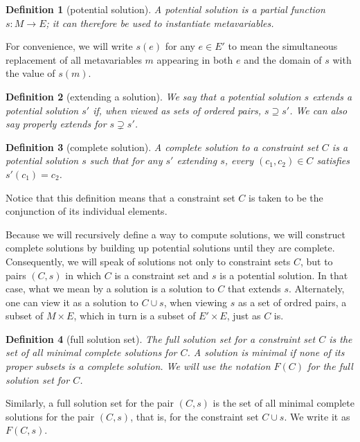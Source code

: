 \documentclass{article}
\newtheorem{dfn}{Definition}
\begin{document}
\begin{dfn}[potential solution]
A \emph{potential solution} is a partial function $s:M\to E$; it can therefore be used to instantiate metavariables.
\end{dfn}

For convenience, we will write $s(e)$ for any $e\in E'$ to mean the simultaneous replacement of all metavariables $m$ appearing in both $e$ and the domain of $s$ with the value of $s(m)$.

\begin{dfn}[extending a solution]
We say that a potential solution $s$ \emph{extends} a potential solution $s'$ if, when viewed as sets of ordered pairs, $s\supseteq s'$.  We can also say \emph{properly extends} for $s\supsetneq s'$.
\end{dfn}

\begin{dfn}[complete solution]\label{D:sol}
A \emph{complete solution} to a constraint set $C$ is a potential solution $s$ such that for any $s'$ extending $s$, every $(c_1,c_2)\in C$ satisfies $s'(c_1)=c_2$.
\end{dfn}

Notice that this definition means that a constraint set $C$ is taken to be the conjunction of its individual elements.

Because we will recursively define a way to compute solutions, we will construct complete solutions by building up potential solutions until they are complete.  Consequently, we will speak of solutions not only to constraint sets $C$, but to pairs $(C,s)$ in which $C$ is a constraint set and $s$ is a potential solution.  In that case, what we mean by a solution is a solution to $C$ that extends $s$.  Alternately, one can view it as a solution to $C\cup s$, when viewing $s$ as a set of ordred pairs, a subset of $M\times E$, which in turn is a subset of $E'\times E$, just as $C$ is.

\begin{dfn}[full solution set]\label{D:F}
The \emph{full solution set} for a constraint set $C$ is the set of all minimal complete solutions for $C$.  A solution is minimal if none of its proper subsets is a complete solution.  We will use the notation $F(C)$ for the full solution set for $C$.
\end{dfn}

Similarly, a full solution set for the pair $(C,s)$ is the set of all minimal complete solutions for the pair $(C,s)$, that is, for the constraint set $C\cup s$.  We write it as $F(C,s)$.
\end{document}
